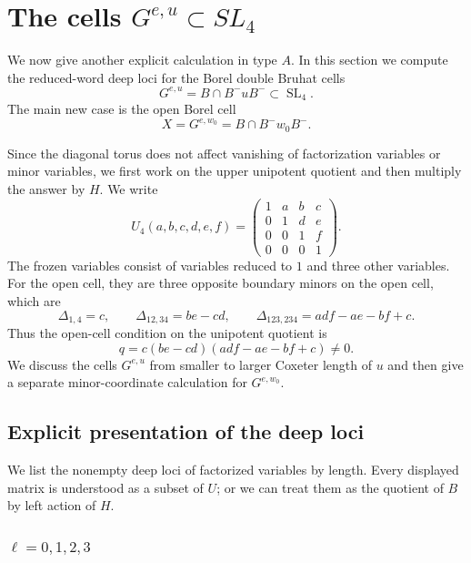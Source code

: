 \documentclass[12pt]{amsart}
\newcommand{\SL}{\operatorname{SL}}
\theoremstyle{plain}
\theoremstyle{definition}
\theoremstyle{remark}
\begin{document}
\section{The cells \texorpdfstring{$G^{e,u}\subset SL_4$}{G(e,u) of SL4.}}\label{sec:sl4borel}

We now give another explicit calculation in type $A$.  In this section we compute the reduced-word deep loci for the Borel double Bruhat cells
\[
   G^{e,u}=B\cap B^-uB^-\subset \SL_4.
\]
The main new case is the open Borel cell
\[
   X=G^{e,w_0}=B\cap B^-w_0B^- .
\]

Since the diagonal torus does not affect vanishing of factorization variables or minor variables, we first work on the upper unipotent quotient and then multiply the answer by $H$.  We write
\[
U_4(a,b,c,d,e,f)=
\begin{pmatrix}
1&a&b&c\\
0&1&d&e\\
0&0&1&f\\
0&0&0&1
\end{pmatrix}.
\]
The frozen variables consist of variables reduced to $1$ and three other variables. For the open cell, they are three opposite boundary minors on the open cell, which are
\begin{equation*}\label{eq:sl4_borel_frozen_matrix}
   \Delta_{1,4}=c,
   \qquad
   \Delta_{12,34}=be-cd,
   \qquad
   \Delta_{123,234}=adf-ae-bf+c.
\end{equation*}
Thus the open-cell condition on the unipotent quotient is
\begin{equation*}\label{eq:sl4_open_condition_matrix}
   q=c(be-cd)(adf-ae-bf+c)\neq0.
\end{equation*}
We discuss the cells $G^{e,u}$ from smaller to larger Coxeter length of $u$ and then give a separate minor-coordinate calculation for $G^{e,w_0}$.
\subsection{Explicit presentation of the deep loci}

We list the nonempty deep loci of factorized variables by length.  Every displayed matrix is understood as a subset of $U$; or we can treat them as the quotient of $B$ by left action of $H$.

\subsubsection*{$\ell = 0,1,2,3$}
\end{document}
